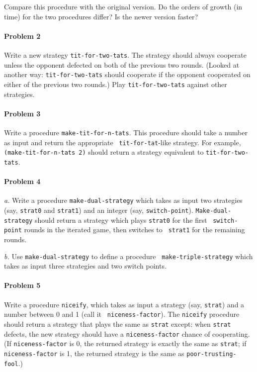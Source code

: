 Compare this procedure with the original version. Do the orders of
growth (in time) for the two procedures differ? Is the newer version
faster?

\paragraph{Problem 2}
Write a new strategy {\tt tit-for-two-tats}. The strategy should always
cooperate unless the opponent defected on both of the previous two
rounds. (Looked at another way: {\tt tit-for-two-tats} should cooperate if
the opponent cooperated on either of the previous two rounds.) Play
{\tt tit-for-two-tats} against other strategies.

\paragraph{Problem 3}
Write a procedure {\tt make-tit-for-n-tats}. This procedure should
take a number as input and return the appropriate {\tt
tit-for-tat}-like strategy.  For example, {\tt (make-tit-for-n-tats
2)} should return a strategy equivalent to {\tt tit-for-two-tats}.

\paragraph{Problem 4}
{\it a.} Write a procedure {\tt make-dual-strategy} which takes as
input two strategies (say, {\tt strat0} and {\tt strat1}) and an
integer (say, {\tt switch-point}). {\tt Make-dual-strategy} should
return a strategy which plays {\tt strat0} for the first {\tt
switch-point} rounds in the iterated game, then switches to {\tt
strat1} for the remaining rounds.

{\it b.} Use {\tt make-dual-strategy} to define a procedure {\tt
make-triple-strategy} which takes as input three strategies and two
switch points.

\paragraph{Problem 5}
Write a procedure {\tt niceify}, which takes as input a strategy (say,
{\tt strat}) and a number between 0 and 1 (call it {\tt
niceness-factor}). The {\tt niceify} procedure should return a
strategy that plays the same as {\tt strat} except: when {\tt strat}
defects, the new strategy should have a {\tt niceness-factor}
chance of cooperating.  (If {\tt niceness-factor} is 0, the returned
strategy is exactly the same as {\tt strat}; if {\tt niceness-factor}
is 1, the returned strategy is the same as {\tt poor-trusting-fool}.)

